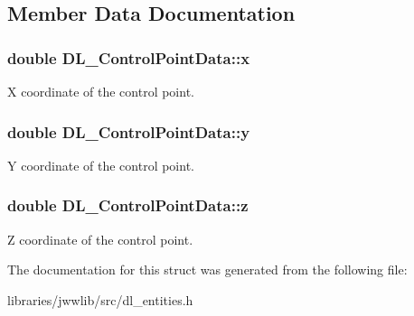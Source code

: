 \subsection{Member Data Documentation}
\hypertarget{structDL__ControlPointData_a0a100ae9328345372eeee06d3ce4ae50}{
\subsubsection[{x}]{\setlength{\rightskip}{0pt plus 5cm}double D\-L\-\_\-\-Control\-Point\-Data\-::x}}\label{structDL__ControlPointData_a0a100ae9328345372eeee06d3ce4ae50}
X coordinate of the control point. \hypertarget{structDL__ControlPointData_a0392960fa7f5949e584bf0a086dcc902}{
\subsubsection[{y}]{\setlength{\rightskip}{0pt plus 5cm}double D\-L\-\_\-\-Control\-Point\-Data\-::y}}\label{structDL__ControlPointData_a0392960fa7f5949e584bf0a086dcc902}
Y coordinate of the control point. \hypertarget{structDL__ControlPointData_a0ee38b90fceb1a8fe4340e01d4ff16d1}{
\subsubsection[{z}]{\setlength{\rightskip}{0pt plus 5cm}double D\-L\-\_\-\-Control\-Point\-Data\-::z}}\label{structDL__ControlPointData_a0ee38b90fceb1a8fe4340e01d4ff16d1}
Z coordinate of the control point. 

The documentation for this struct was generated from the following file\-:\begin{DoxyCompactItemize}
\item 
libraries/jwwlib/src/dl\-\_\-entities.\-h\end{DoxyCompactItemize}

